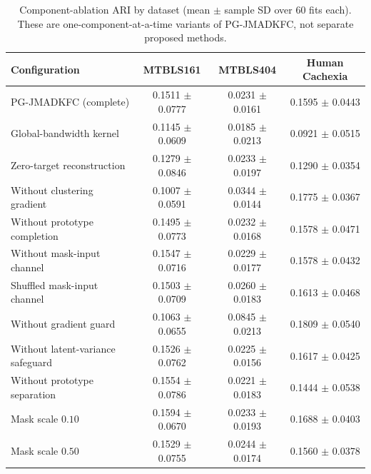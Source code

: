 \begin{table}[t]
\centering
\caption{Component-ablation ARI by dataset (mean $\pm$ sample SD over 60 fits each). These are one-component-at-a-time variants of PG-JMADKFC, not separate proposed methods.}
\label{tab:supp_component_sd}
\scriptsize
\setlength{\tabcolsep}{4pt}
\begin{tabular}{lccc}
\toprule
Configuration & MTBLS161 & MTBLS404 & Human Cachexia \\
\midrule
PG-JMADKFC (complete) & 0.1511 $\pm$ 0.0777 & 0.0231 $\pm$ 0.0161 & 0.1595 $\pm$ 0.0443 \\
Global-bandwidth kernel & 0.1145 $\pm$ 0.0609 & 0.0185 $\pm$ 0.0213 & 0.0921 $\pm$ 0.0515 \\
Zero-target reconstruction & 0.1279 $\pm$ 0.0846 & 0.0233 $\pm$ 0.0197 & 0.1290 $\pm$ 0.0354 \\
Without clustering gradient & 0.1007 $\pm$ 0.0591 & 0.0344 $\pm$ 0.0144 & 0.1775 $\pm$ 0.0367 \\
Without prototype completion & 0.1495 $\pm$ 0.0773 & 0.0232 $\pm$ 0.0168 & 0.1578 $\pm$ 0.0471 \\
Without mask-input channel & 0.1547 $\pm$ 0.0716 & 0.0229 $\pm$ 0.0177 & 0.1578 $\pm$ 0.0432 \\
Shuffled mask-input channel & 0.1503 $\pm$ 0.0709 & 0.0260 $\pm$ 0.0183 & 0.1613 $\pm$ 0.0468 \\
Without gradient guard & 0.1063 $\pm$ 0.0655 & 0.0845 $\pm$ 0.0213 & 0.1809 $\pm$ 0.0540 \\
Without latent-variance safeguard & 0.1526 $\pm$ 0.0762 & 0.0225 $\pm$ 0.0156 & 0.1617 $\pm$ 0.0425 \\
Without prototype separation & 0.1554 $\pm$ 0.0786 & 0.0221 $\pm$ 0.0183 & 0.1444 $\pm$ 0.0538 \\
Mask scale $0.10$ & 0.1594 $\pm$ 0.0670 & 0.0233 $\pm$ 0.0193 & 0.1688 $\pm$ 0.0403 \\
Mask scale $0.50$ & 0.1529 $\pm$ 0.0755 & 0.0244 $\pm$ 0.0174 & 0.1560 $\pm$ 0.0378 \\
\bottomrule
\end{tabular}
\end{table}

